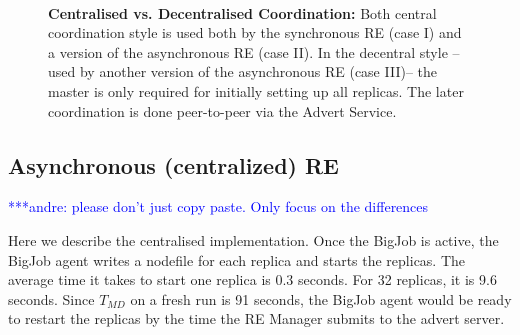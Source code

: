 \documentclass{rspublic}
\newcommand{\alnote}[1]{ {\textcolor{blue} { ***andre: #1 }}}
\newcommand{\alnote}[1]{}
\begin{document}
\begin{figure}%
\centering
{}\qquad
{}\\
\caption{\textbf{Centralised vs. Decentralised Coordination:} Both
  central coordination style is used both by the synchronous RE (case
  I) and a version of the asynchronous RE (case II).  In the decentral
  style -- used by another version of the asynchronous RE (case III)--
  the master is only required for initially setting up all
  replicas. The later coordination is done peer-to-peer via the Advert
  Service.}
\label{fig:coordination}
\end{figure}


\subsection{Asynchronous (centralized) RE}
\alnote{please don't just copy paste. Only focus on the differences}


Here we describe the centralised
implementation.
 Once the BigJob is active, the BigJob agent writes a nodefile for
each replica and starts the replicas. The average time it takes to
start one replica is 0.3 seconds. For 32 replicas, it is 9.6
seconds. Since $T_{MD}$ on a fresh run is 91 seconds, the BigJob agent
would be ready to restart the replicas by the time the RE Manager
submits to the advert server.
\end{document}
